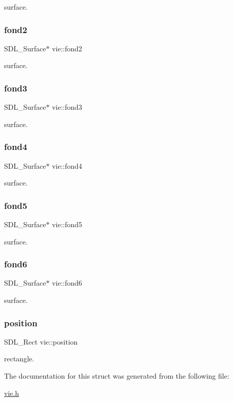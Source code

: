 surface. \mbox{\label{structvie_a6ecad7f4161cb602faa27d2de9e3ee50}} 
\subsubsection{\texorpdfstring{fond2}{fond2}}
{\footnotesize\ttfamily S\+D\+L\+\_\+\+Surface$\ast$ vie\+::fond2}

surface. \mbox{\label{structvie_a9763ef794bb12262f5826b911d20e42b}} 
\subsubsection{\texorpdfstring{fond3}{fond3}}
{\footnotesize\ttfamily S\+D\+L\+\_\+\+Surface$\ast$ vie\+::fond3}

surface. \mbox{\label{structvie_a0b08072b8c7ec9e1adfd6e26b4fcb39f}} 
\subsubsection{\texorpdfstring{fond4}{fond4}}
{\footnotesize\ttfamily S\+D\+L\+\_\+\+Surface$\ast$ vie\+::fond4}

surface. \mbox{\label{structvie_adabeccdf7e33dd53ac6d85a24fc3931d}} 
\subsubsection{\texorpdfstring{fond5}{fond5}}
{\footnotesize\ttfamily S\+D\+L\+\_\+\+Surface$\ast$ vie\+::fond5}

surface. \mbox{\label{structvie_afe9825545f1294799e27a037803d79b0}} 
\subsubsection{\texorpdfstring{fond6}{fond6}}
{\footnotesize\ttfamily S\+D\+L\+\_\+\+Surface$\ast$ vie\+::fond6}

surface. \mbox{\label{structvie_a916050892cf1e7b8039952dcafa44825}} 
\subsubsection{\texorpdfstring{position}{position}}
{\footnotesize\ttfamily S\+D\+L\+\_\+\+Rect vie\+::position}

rectangle. 

The documentation for this struct was generated from the following file\+:\begin{DoxyCompactItemize}
\item 
\hyperlink{vie_8h}{vie.\+h}\end{DoxyCompactItemize}
